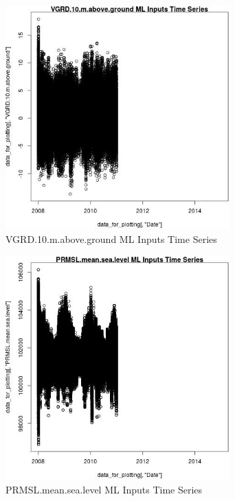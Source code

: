 \begin{figure} 
\centering  
\includegraphics[width=0.77\textwidth]{Code_Outputs/ML_input_report_ML_input_PM25_Step5_part_d_de_duplicated_aves_ML_input_VGRD10mabovegroundvDate.jpg} 
\caption{\label{fig:ML_input_report_ML_input_PM25_Step5_part_d_de_duplicated_aves_ML_inputVGRD10mabovegroundvDate}VGRD.10.m.above.ground ML Inputs Time Series} 
\end{figure} 
 

\begin{figure} 
\centering  
\includegraphics[width=0.77\textwidth]{Code_Outputs/ML_input_report_ML_input_PM25_Step5_part_d_de_duplicated_aves_ML_input_PRMSLmeansealevelvDate.jpg} 
\caption{\label{fig:ML_input_report_ML_input_PM25_Step5_part_d_de_duplicated_aves_ML_inputPRMSLmeansealevelvDate}PRMSL.mean.sea.level ML Inputs Time Series} 
\end{figure} 
 

